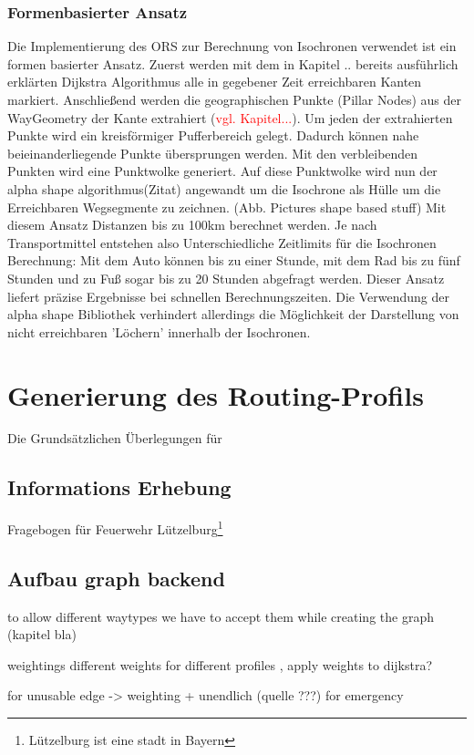 \documentclass[10pt,a4paper]{article}
\newcommand\todo[1]{\textcolor{red}{#1}}
\begin{document}
\subsubsection{Formenbasierter Ansatz}
Die Implementierung des ORS zur Berechnung von Isochronen verwendet ist ein formen basierter Ansatz. Zuerst werden mit dem in Kapitel .. bereits ausführlich erklärten Dijkstra Algorithmus alle in gegebener Zeit erreichbaren Kanten markiert. Anschließend werden die geographischen Punkte (Pillar Nodes) aus der  WayGeometry der Kante extrahiert (\todo{vgl. Kapitel...}).  Um jeden der extrahierten Punkte wird ein kreisförmiger Pufferbereich gelegt. Dadurch können nahe beieinanderliegende Punkte übersprungen werden. Mit den verbleibenden Punkten wird eine Punktwolke generiert. Auf diese Punktwolke wird nun der alpha shape algorithmus(Zitat) angewandt um die Isochrone als Hülle um die Erreichbaren Wegsegmente zu zeichnen.
(Abb. Pictures shape based stuff)
Mit diesem Ansatz Distanzen bis zu 100km berechnet werden. Je nach Transportmittel entstehen also Unterschiedliche Zeitlimits für die Isochronen Berechnung: Mit dem Auto können bis zu einer Stunde, mit dem Rad bis zu fünf Stunden und zu Fuß sogar bis zu 20 Stunden abgefragt werden. Dieser Ansatz liefert präzise Ergebnisse bei schnellen Berechnungszeiten. Die Verwendung der alpha shape Bibliothek verhindert allerdings die Möglichkeit der Darstellung von nicht erreichbaren 'Löchern' innerhalb der Isochronen.


\section{Generierung des Routing-Profils}
Die Grundsätzlichen Überlegungen für 
\subsection{Informations Erhebung}
Fragebogen für Feuerwehr Lützelburg\footnote{Lützelburg ist eine stadt in Bayern}

\subsection{Aufbau graph backend}
to allow different waytypes we have to accept them while creating the graph (kapitel bla)

weightings 
 different weights for different profiles , apply weights to dijkstra?
 
 for unusable edge -> weighting + unendlich (quelle ???)
 for emergency 
 
\end{document}

